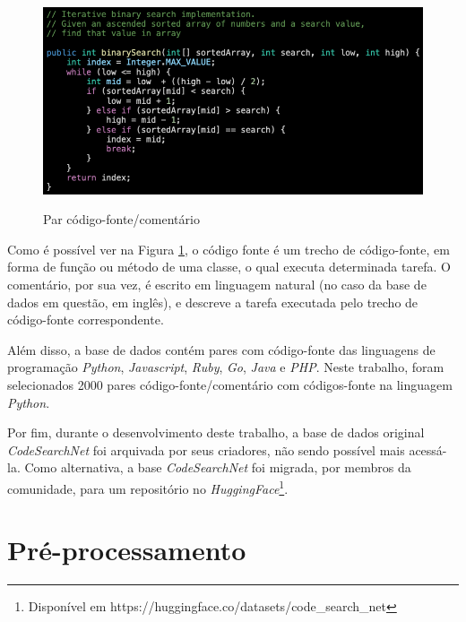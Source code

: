\begin{figure}[H]
    \centering
        \caption{Par código-fonte/comentário}
        \includegraphics[scale=0.55]{code-comment-pair.png}
        \label{fig:metodology-code-comment-pair}
\end{figure}

Como é possível ver na Figura \ref{fig:metodology-code-comment-pair}, o código fonte é um trecho de código-fonte, em forma de função ou método de uma classe, o qual executa determinada tarefa. O comentário, por sua vez, é escrito em linguagem natural (no caso da base de dados em questão, em inglês), e descreve a tarefa executada pelo trecho de código-fonte correspondente.

Além disso, a base de dados contém pares com código-fonte das linguagens de programação \textit{Python}, \textit{Javascript}, \textit{Ruby}, \textit{Go}, \textit{Java} e \textit{PHP}. Neste trabalho, foram selecionados 2000 pares código-fonte/comentário com códigos-fonte na linguagem \textit{Python}.

Por fim, durante o desenvolvimento deste trabalho, a base de dados original \textit{CodeSearchNet} foi arquivada por seus criadores, não sendo possível mais acessá-la. Como alternativa, a base \textit{CodeSearchNet} foi migrada, por membros da comunidade, para um repositório no \textit{HuggingFace}\footnote{Disponível em https://huggingface.co/datasets/code\_search\_net}.


\section{Pré-processamento}
\label{sec:methodology:pre-processing}

